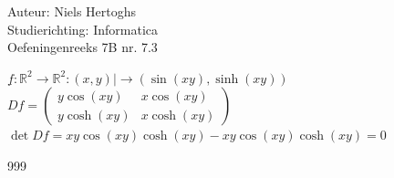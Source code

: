 \documentclass[a4paper]{article}
\begin{document}
  
\noindent \large Auteur: Niels Hertoghs \\
\noindent \large Studierichting: Informatica\\
\noindent \large Oefeningenreeks 7B nr. 7.3\\

\medskip

\normalsize

$\underline{f}:\mathbb{R}^2 \rightarrow \mathbb{R}^2:(x,y) \mid\rightarrow (\sin(xy),\sinh(xy))$\\

$Df =\left( \begin{array}{cc}
	y \cos(xy) & x \cos(xy) \\
	y \cosh(xy) & x \cosh(xy)
\end{array}\right)$\\

$\det Df = xy \cos(xy)\cosh(xy) - xy \cos(xy)\cosh(xy) = 0$\\




\begin{thebibliography}{999}
\end{thebibliography}
\end{document}
